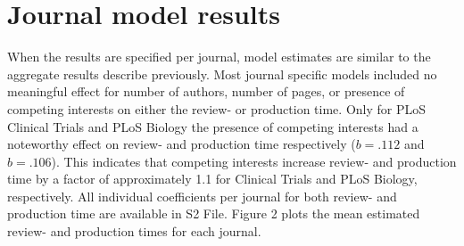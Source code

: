 \section*{Journal model results}
When the results are specified per journal, model estimates are similar to the aggregate results describe previously. Most journal specific models included no meaningful effect for number of authors, number of pages, or presence of competing interests on either the review- or production time. Only for PLoS Clinical Trials and PLoS Biology the presence of competing interests had a noteworthy effect on review- and production time respectively ($b=.112$ and $b=.106$). This indicates that competing interests increase review- and production time by a factor of approximately 1.1 for Clinical Trials and PLoS Biology, respectively. All individual coefficients per journal for both review- and production time are available in S2 File. Figure 2 plots the mean estimated review- and production times for each journal.